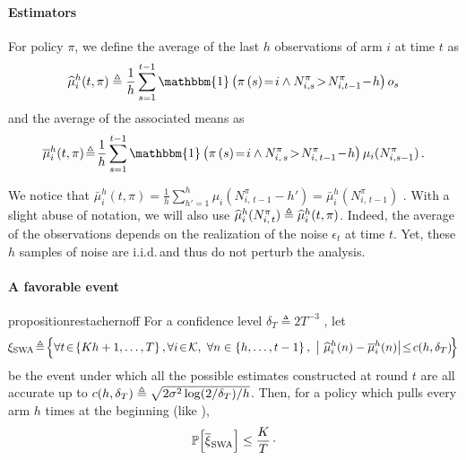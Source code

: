 \paragraph{Estimators}  
For policy $\pi$, we define the average of the last $h$ observations of arm $i$ at time $t$ as
\[\widehat{\mu}_i^h(t,\pi) \triangleq \frac{1}{h}\sum_{s=1}^{t-1} \mathbbm{1}\pa{\pi\pa{s}\! =\! i \land N_{i,s}^\pi\!>\! N_{i,t-1}^\pi\! -\! h } o_{s}\]
and the average of the associated means as
\[\bar{\mu}_i^h(t,\pi) \!\triangleq\! \frac{1}{h}\sum_{s=1}^{t-1} \mathbbm{1}\pa{\pi\pa{s}\! =\! i \land N_{i,\,s}^\pi\!>\! N_{i,\,t-1}^\pi\! -\! h } \mu_{i}(N_{i,s-1}^\pi)\,.\] 

We notice that $\bar{\mu}_i^h(t,\pi) = \frac{1}{h}\sum_{h'=1}^{h} \mu_i(N_{i,\,t-1}^\pi-h') = \bar{\mu}_i^h(N_{i,\,t-1}^\pi)$ . With a slight abuse of notation, we will also use $\widehat{\mu}_i^h(N_{i,\,t}^\pi) \triangleq \widehat{\mu}_i^h(t,\pi)$. Indeed, the average of the observations depends on the realization of the noise $\epsilon_t$ at time $t$. Yet, these $h$ samples of noise are i.i.d.\,and thus do not perturb the analysis. 



\paragraph{A favorable event}

\begin{restatable}{proposition}{restachernoff}
\label{prop:prb_favorable_event_SWA}
For a confidence level $\delta_{T} \triangleq 2T^{-3}$
, let
\begin{equation}
\!\HPevent_{\rm SWA} \! \triangleq\! \Big\{\forall t\!\in\!\left\{Kh +1, \dots, T\right\}, \forall i\!\in\!\mathcal{K},\ \forall n\in \left\{h, \dots, t-1\right\}, \ \big| \ \hmu_i^h(n) - \bmu_i^h(n) \big| \!\leq\! c(\window, \delta_{T}) \!\Big\}
\label{eq:def_favorable_event_SWA}
\end{equation}
be the event under which all the possible estimates constructed at round $t$ are all accurate up to $c(h,\delta_{T}) \triangleq \sqrt{2 \sigma^2\log(2/\delta_T)/h}$. Then, for a policy which pulls every arm $h$ times at the beginning (like \SWA),
\[
\mathbb{P}\Big[\overline{\xi}_{\rm SWA}\Big] \leq\frac{K}{T}\,\cdot
\]
\end{restatable} 


